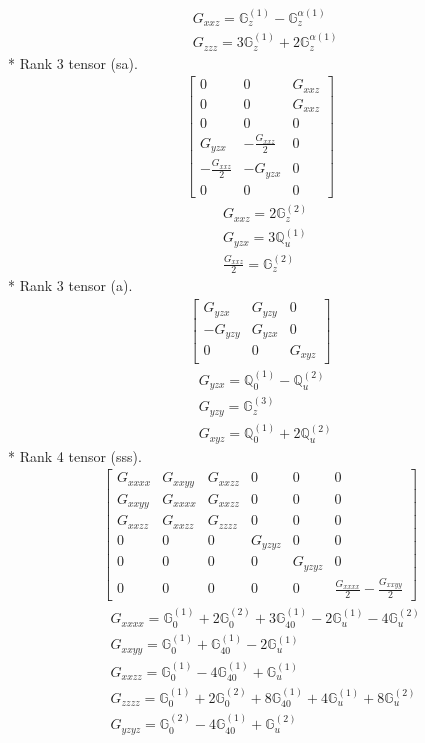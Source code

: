 \documentclass[fleqn,8pt,landscape]{jsarticle}
\begin{document}
\begin{align*}
& G_{xxz} = \mathbb{G}_{z}^{(1)} - \mathbb{G}_{z}^{\alpha(1)} \\
& G_{zzz} = 3 \mathbb{G}_{z}^{(1)} + 2 \mathbb{G}_{z}^{\alpha(1)}
\end{align*}
* Rank 3 tensor (sa).
\begin{align*}
\begin{bmatrix} 0 & 0 & G_{xxz} \\ 0 & 0 & G_{xxz} \\ 0 & 0 & 0 \\ G_{yzx} & - \frac{G_{xxz}}{2} & 0 \\ - \frac{G_{xxz}}{2} & - G_{yzx} & 0 \\ 0 & 0 & 0 \end{bmatrix}
\end{align*}
\begin{align*}
& G_{xxz} = 2 \mathbb{G}_{z}^{(2)} \\
& G_{yzx} = 3 \mathbb{Q}_{u}^{(1)} \\
& \frac{G_{xxz}}{2} = \mathbb{G}_{z}^{(2)}
\end{align*}
* Rank 3 tensor (a).
\begin{align*}
\begin{bmatrix} G_{yzx} & G_{yzy} & 0 \\ - G_{yzy} & G_{yzx} & 0 \\ 0 & 0 & G_{xyz} \end{bmatrix}
\end{align*}
\begin{align*}
& G_{yzx} = \mathbb{Q}_{0}^{(1)} - \mathbb{Q}_{u}^{(2)} \\
& G_{yzy} = \mathbb{G}_{z}^{(3)} \\
& G_{xyz} = \mathbb{Q}_{0}^{(1)} + 2 \mathbb{Q}_{u}^{(2)}
\end{align*}
* Rank 4 tensor (sss).
\begin{align*}
\begin{bmatrix} G_{xxxx} & G_{xxyy} & G_{xxzz} & 0 & 0 & 0 \\ G_{xxyy} & G_{xxxx} & G_{xxzz} & 0 & 0 & 0 \\ G_{xxzz} & G_{xxzz} & G_{zzzz} & 0 & 0 & 0 \\ 0 & 0 & 0 & G_{yzyz} & 0 & 0 \\ 0 & 0 & 0 & 0 & G_{yzyz} & 0 \\ 0 & 0 & 0 & 0 & 0 & \frac{G_{xxxx}}{2} - \frac{G_{xxyy}}{2} \end{bmatrix}
\end{align*}
\begin{align*}
& G_{xxxx} = \mathbb{G}_{0}^{(1)} + 2 \mathbb{G}_{0}^{(2)} + 3 \mathbb{G}_{40}^{(1)} - 2 \mathbb{G}_{u}^{(1)} - 4 \mathbb{G}_{u}^{(2)} \\
& G_{xxyy} = \mathbb{G}_{0}^{(1)} + \mathbb{G}_{40}^{(1)} - 2 \mathbb{G}_{u}^{(1)} \\
& G_{xxzz} = \mathbb{G}_{0}^{(1)} - 4 \mathbb{G}_{40}^{(1)} + \mathbb{G}_{u}^{(1)} \\
& G_{zzzz} = \mathbb{G}_{0}^{(1)} + 2 \mathbb{G}_{0}^{(2)} + 8 \mathbb{G}_{40}^{(1)} + 4 \mathbb{G}_{u}^{(1)} + 8 \mathbb{G}_{u}^{(2)} \\
& G_{yzyz} = \mathbb{G}_{0}^{(2)} - 4 \mathbb{G}_{40}^{(1)} + \mathbb{G}_{u}^{(2)}
\end{align*}
\end{document}
